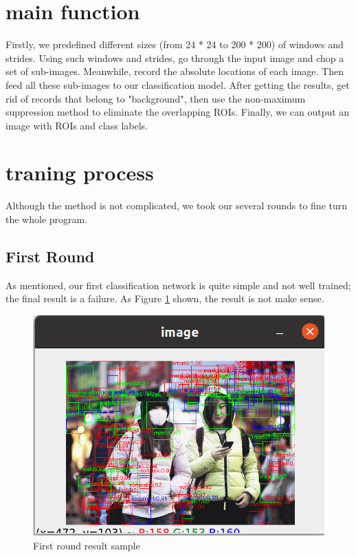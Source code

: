 \documentclass[10pt,a4paper]{report}
\begin{document}
\section{main function}
Firstly, we predefined different sizes (from 24 * 24 to 200 * 200) of windows and strides. Using such windows and strides, go through the input image and chop a set of sub-images. Meanwhile, record the absolute locations of each image. Then feed all these sub-images to our classification model. After getting the results, get rid of records that belong to "background", then use the non-maximum suppression method to eliminate the overlapping ROIs. Finally, we can output an image with ROIs and class labels.  
\section{traning process}
Although the method is not complicated, we took our several rounds to fine turn the whole program.
\subsection{First Round}
As mentioned, our first classification network is quite simple and not well trained; the final result is a failure. As Figure \ref{fig:f1} shown, the result is not make sense.
 \begin{figure}[hbtp]

\centering
\includegraphics[scale=0.4]{imgs/r1.png}
\caption{First round result sample}
        \label{fig:f1}
\end{figure}
\end{document}
